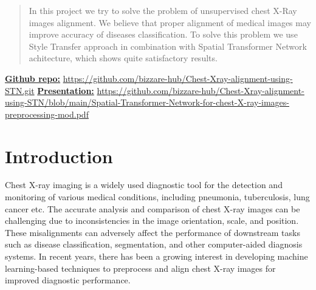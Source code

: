 \documentclass{article}
\begin{document}
\printAffiliationsAndNotice{}  %
\begin{abstract}

In this project we try to solve the problem of unsupervised chest X-Ray images
 alignment. We believe that proper alignment of medical images may improve accuracy
 of diseases classification. To solve this problem we use Style Transfer approach
 in combination with Spatial Transformer Network achitecture, which shows quite
 satisfactory results.

\end{abstract}

\underline{\textbf{Github repo:}} \href{https://github.com/bizzare-hub/Chest-Xray-alignment-using-STN.git}{https://github.com/bizzare-hub/Chest-Xray-alignment-using-STN.git}\newline
\underline{\textbf{Presentation:}} \href{https://github.com/bizzare-hub/Chest-Xray-alignment-using-STN/blob/main/Spatial-Transformer-Network-for-chest-X-ray-images-preprocessing-mod.pdf}{https://github.com/bizzare-hub/Chest-Xray-alignment-using-STN/blob/main/Spatial-Transformer-Network-for-chest-X-ray-images-preprocessing-mod.pdf}

\section{Introduction}\label{introduction}

Chest X-ray imaging is a widely used diagnostic tool for the detection and 
 monitoring of various medical conditions, including pneumonia, tuberculosis, 
 lung cancer etc. The accurate analysis and comparison of chest X-ray images 
 can be challenging due to inconsistencies in the image orientation, scale, 
 and position. These misalignments can adversely affect the performance of 
 downstream tasks such as disease classification, segmentation, and other 
 computer-aided diagnosis systems. In recent years, there has been a growing 
 interest in developing machine learning-based techniques to preprocess and 
 align chest X-ray images for improved diagnostic performance.
\end{document}
